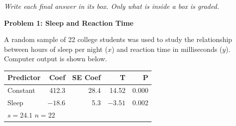 \documentclass[10pt]{article}
\begin{document}
{\small\itshape Write each final answer in its box. Only what is inside a box is graded.}\par

\vspace{0.1in}

\textbf{Problem 1: Sleep and Reaction Time}

\vspace{0.05in}
A random sample of 22 college students was used to study the relationship between hours
of sleep per night ($x$) and reaction time in milliseconds ($y$). Computer output is
shown below.

\vspace{0.1in}
\begin{center}
\renewcommand{\arraystretch}{1.3}
\begin{tabular}{lrrrr}
    \textbf{Predictor} & \textbf{Coef} & \textbf{SE Coef} & \textbf{T} & \textbf{P} \\
    \hline
    Constant & 412.3 & 28.4 & 14.52 & 0.000 \\
    Sleep    & $-18.6$ & 5.3 & $-3.51$ & 0.002 \\
    \hline
    \multicolumn{5}{l}{$s = 24.1$ \quad $n = 22$}
\end{tabular}
\end{center}
\end{document}
